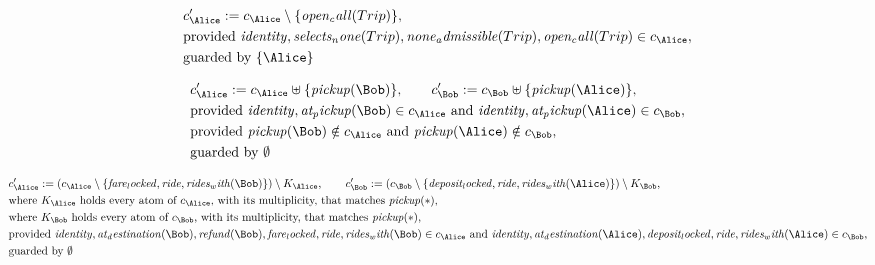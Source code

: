 \begin{align*}
&
c'_
{
\Alice
}
 := 
c_
{
\Alice
}
 \setminus 
\{
\mathit{
open_call
}
(
Trip
)
\}
,\\
&
\text{provided } 
\mathit{
identity
}
,
\mathit{
selects_none
}
(
Trip
)
,
\mathit{
none_admissible
}
(
Trip
)
,
\mathit{
open_call
}
(
Trip
)
 \in c_
{
\Alice
}
,\\
&
\text{guarded by } \{
\Alice
\}
\end{align*}

\begin{align*}
&
c'_
{
\Alice
}
 := 
c_
{
\Alice
}
 \uplus 
\{
\mathit{
pickup
}
(
\Bob
)
\}
, \qquad 
c'_
{
\Bob
}
 := 
c_
{
\Bob
}
 \uplus 
\{
\mathit{
pickup
}
(
\Alice
)
\}
,\\
&
\text{provided } 
\mathit{
identity
}
,
\mathit{
at_pickup
}
(
\Bob
)
 \in c_
{
\Alice
}
 \text{ and } 
\mathit{
identity
}
,
\mathit{
at_pickup
}
(
\Alice
)
 \in c_
{
\Bob
}
,\\
&
\text{provided } 
\mathit{
pickup
}
(
\Bob
)
 \notin c_
{
\Alice
}
 \text{ and } 
\mathit{
pickup
}
(
\Alice
)
 \notin c_
{
\Bob
}
,\\
&
\text{guarded by } \emptyset
\end{align*}

\begin{align*}
&
c'_
{
\Alice
}
 := 
(c_
{
\Alice
}
 \setminus 
\{
\mathit{
fare_locked
}
,
\mathit{
ride
}
,
\mathit{
rides_with
}
(
\Bob
)
\}
) \setminus K_
{
\Alice
}
, \qquad 
c'_
{
\Bob
}
 := 
(c_
{
\Bob
}
 \setminus 
\{
\mathit{
deposit_locked
}
,
\mathit{
ride
}
,
\mathit{
rides_with
}
(
\Alice
)
\}
) \setminus K_
{
\Bob
}
,\\
&
\text{where } K_
{
\Alice
}
 \text{ holds every atom of } c_
{
\Alice
}
 \text{, with its multiplicity, that matches } 
\mathit{
pickup
}
(
\ast
)
,\\
&
\text{where } K_
{
\Bob
}
 \text{ holds every atom of } c_
{
\Bob
}
 \text{, with its multiplicity, that matches } 
\mathit{
pickup
}
(
\ast
)
,\\
&
\text{provided } 
\mathit{
identity
}
,
\mathit{
at_destination
}
(
\Bob
)
,
\mathit{
refund
}
(
\Bob
)
,
\mathit{
fare_locked
}
,
\mathit{
ride
}
,
\mathit{
rides_with
}
(
\Bob
)
 \in c_
{
\Alice
}
 \text{ and } 
\mathit{
identity
}
,
\mathit{
at_destination
}
(
\Alice
)
,
\mathit{
deposit_locked
}
,
\mathit{
ride
}
,
\mathit{
rides_with
}
(
\Alice
)
 \in c_
{
\Bob
}
,\\
&
\text{guarded by } \emptyset
\end{align*}

